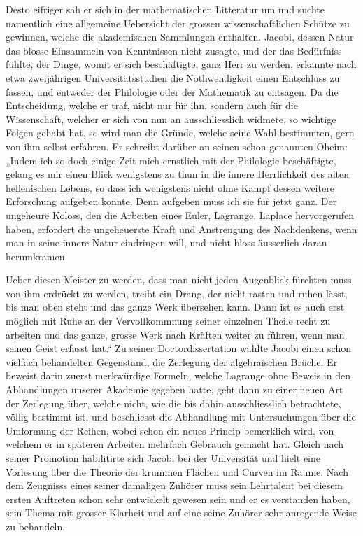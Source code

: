 \documentclass[11pt]{article}
\begin{document}
Desto eifriger sah er sich in der mathematischen Litteratur um und suchte namentlich eine allgemeine Uebersicht der grossen wissenschaftlichen Schütze zu gewinnen, welche die akademischen Sammlungen enthalten. Jacobi, dessen Natur das blosse Einsammeln von Kenntnissen nicht zusagte, und der das Bedürfniss fühlte, der Dinge, womit er sich beschäftigte, ganz Herr zu werden, erkannte nach etwa zweijährigen Universitätsstudien die Nothwendigkeit einen Entschluss zu fassen, und entweder der Philologie oder der Mathematik zu entsagen. Da die Entscheidung, welche er traf, nicht nur für ihn, sondern auch für die Wissenschaft, welcher er sich von nun an ausschliesslich widmete, so wichtige Folgen gehabt hat, so wird man die Gründe, welche seine Wahl bestimmten, gern von ihm selbst erfahren. Er schreibt darüber an seinen schon genannten Oheim: „Indem ich so doch einige Zeit mich ernstlich mit der Philologie beschäftigte, gelang es mir einen Blick wenigstens zu thun in die innere Herrlichkeit des alten hellenischen Lebens, so dass ich wenigstens nicht ohne Kampf dessen weitere Erforschung aufgeben konnte. Denn aufgeben muss ich sie für jetzt ganz. Der ungeheure Koloss, den die Arbeiten eines Euler, Lagrange, Laplace hervorgerufen haben, erfordert die ungeheuerste Kraft und Anstrengung des Nachdenkens, wenn man in seine innere Natur eindringen will, und nicht bloss äusserlich daran herumkramen.

Ueber diesen Meister zu werden, dass man nicht jeden Augenblick fürchten muss von ihm erdrückt zu werden, treibt ein Drang, der nicht rasten und ruhen lässt, bis man oben steht und das ganze Werk übersehen kann. Dann ist es auch erst möglich mit Ruhe an der Vervollkommnung seiner einzelnen Theile recht zu arbeiten und das ganze, grosse Werk nach Kräften weiter zu führen, wenn man seinen Geist erfasst hat.“ Zu seiner Doctordissertation wählte Jacobi einen schon vielfach behandelten Gegenstand, die Zerlegung der algebraischen Brüche. Er beweist darin zuerst merkwürdige Formeln, welche Lagrange ohne Beweis in den Abhandlungen unserer Akademie gegeben hatte, geht dann zu einer neuen Art der Zerlegung über, welche nicht, wie die bis dahin ausschliesslich betrachtete, völlig bestimmt ist, und beschliesst die Abhandlung mit Untersuchungen über die Umformung der Reihen, wobei schon ein neues Princip bemerklich wird, von welchem er in späteren Arbeiten mehrfach Gebrauch gemacht hat. Gleich nach seiner Promotion habilitirte sich Jacobi bei der Universität und hielt eine Vorlesung über die Theorie der krummen Flächen und Curven im Raume. Nach dem Zeugnisss eines seiner damaligen Zuhörer muss sein Lehrtalent bei diesem ersten Auftreten schon sehr entwickelt gewesen sein und er es verstanden haben, sein Thema mit grosser Klarheit und auf eine seine Zuhörer sehr anregende Weise zu behandeln.
\end{document}
